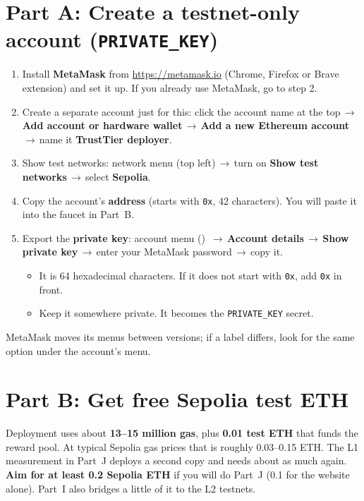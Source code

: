 \documentclass[11pt,a4paper]{article}
\newcommand{\ui}[1]{\textsf{\textbf{#1}}}
\newcommand{\code}[1]{\texttt{#1}}
\newcommand{\arr}{\,$\rightarrow$\,}
\begin{document}
\section{Part A: Create a testnet-only account (\code{PRIVATE\_KEY})}
\begin{enumerate}
  \item Install \textbf{MetaMask} from \url{https://metamask.io} (Chrome, Firefox or Brave extension) and set it up. If you already use MetaMask, go to step 2.
  \item Create a separate account just for this: click the account name at the top\arr\ui{Add account or hardware wallet}\arr\ui{Add a new Ethereum account}\arr name it \ui{TrustTier deployer}.
  \item Show test networks: network menu (top left)\arr turn on \ui{Show test networks}\arr select \ui{Sepolia}.
  \item Copy the account's \textbf{address} (starts with \code{0x}, 42 characters). You will paste it into the faucet in Part~B.
  \item Export the \textbf{private key}: account menu (\faEllipsisV) \arr\ui{Account details}\arr\ui{Show private key}\arr enter your MetaMask password\arr copy it.
  \begin{itemize}
    \item It is 64 hexadecimal characters. If it does not start with \code{0x}, add \code{0x} in front.
    \item Keep it somewhere private. It becomes the \code{PRIVATE\_KEY} secret.
  \end{itemize}
\end{enumerate}
{\small MetaMask moves its menus between versions; if a label differs, look for the same option under the account's \ui{\faEllipsisV} menu.}

\section{Part B: Get free Sepolia test ETH}
Deployment uses about \textbf{13--15 million gas}, plus \textbf{0.01 test ETH} that funds the reward pool. At typical Sepolia gas prices that is roughly 0.03--0.15 ETH. The L1 measurement in Part~J deploys a second copy and needs about as much again. \textbf{Aim for at least 0.2 Sepolia ETH} if you will do Part~J (0.1 for the website alone). Part~I also bridges a little of it to the L2 testnets.
\end{document}
